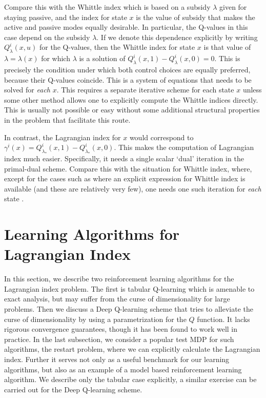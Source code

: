 \documentclass[12pt]{article}
\numberwithin{equation}{section}
\newcommand{\1}{\textbf{1}}
\begin{document}
Compare this with the Whittle index which is based on a subsidy $\lambda$ given for staying passive, and the index for state $x$ is the value of subsidy that makes the active and passive modes equally desirable. In particular, the Q-values in this case depend on the subsidy $\lambda$. If we denote this dependence explicitly by writing $Q^i_\lambda(x,u)$ for the Q-values, then the Whittle index for state $x$ is that value of $\lambda=\lambda(x)$ for which $\lambda$ is a solution of $Q^i_\lambda(x,1) - Q^i_\lambda(x,0)=0$. 
This is precisely the condition under which both control choices are equally preferred, because their Q-values coincide. This is a system of equations that needs to be solved for \textit{each} $x$. This requires a separate iterative scheme for each state $x$  unless some other method allows one to explicitly compute the Whittle indices directly. This is usually not possible or easy without some additional structural properties in the problem that facilitate this route.

In contrast, the Lagrangian index for $x$ would correspond to 
$\gamma^i(x) = Q^i_{\lambda_*}(x,1) - Q^i_{\lambda_*}(x,0)$. This makes the computation of Lagrangian index much easier.  
Specifically, it needs a single scalar `dual' iteration in the primal-dual scheme. Compare this with the situation for Whittle index, where, except for the cases such as \cite{Avrachenkov} where an explicit expression for Whittle index is available (and these are relatively very few), one needs one such iteration for \textit{each} state \cite{Avrachenkov2}. \\

\section{Learning Algorithms for Lagrangian Index}

In this section, we describe two reinforcement learning algorithms for the Lagrangian index problem. The first is tabular Q-learning which is amenable to exact analysis, but may suffer from the curse of dimensionality for large problems. Then we discuss a Deep Q-learning scheme that tries to alleviate the curse of dimensionality by using a parametrization for the $Q$ function. It lacks rigorous convergence guarantees, though it has been found to work well in practice. In the last subsection, we consider a popular test MDP for such algorithms, the restart problem, where we can explicitly calculate the Lagrangian index. Further it serves not only as a useful benchmark for our learning algorithms, but also as an example of a model based reinforcement learning algorithm.  We describe only the tabular case explicitly, a similar exercise can be carried out for the Deep Q-learning scheme.
\end{document}
